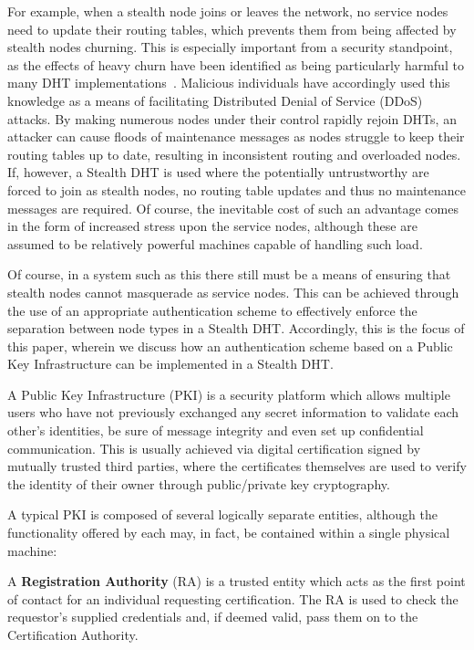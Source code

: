 \documentclass[times, 10pt,twocolumn]{article}
\begin{document}
For example, when a stealth node joins or leaves the network, no
service nodes need to update their routing tables, which prevents them
from being affected by stealth nodes churning. This is especially
important from a security standpoint, as the effects of heavy churn
have been identified as being particularly harmful to many DHT
implementations~\cite{Rhea04Handling}\cite{Li04Comparing}. Malicious
individuals have accordingly used this knowledge as a means of
facilitating Distributed Denial of Service (DDoS) attacks. By making
numerous nodes under their control rapidly rejoin DHTs, an attacker can
cause floods of maintenance messages as nodes struggle to keep their
routing tables up to date, resulting in inconsistent routing and
overloaded nodes. If, however, a Stealth DHT is used where the
potentially untrustworthy are forced to join as stealth nodes, no
routing table updates and thus no maintenance messages are required. Of
course, the inevitable cost of such an advantage comes in the form of
increased stress upon the service nodes, although these are assumed to
be relatively powerful machines capable of handling such load.

Of course, in a system such as this there still must be a means of
ensuring that stealth nodes cannot masquerade as service nodes. This
can be achieved through the use of an appropriate authentication scheme
to effectively enforce the separation between node types in a Stealth
DHT. Accordingly, this is the focus of this paper, wherein we discuss
how an authentication scheme based on a Public Key Infrastructure can
be implemented in a Stealth DHT.

\label{sect-pkioverview}

A Public Key Infrastructure (PKI) is a security platform which allows
multiple users who have not previously exchanged any secret information
to validate each other's identities, be sure of message integrity and
even set up confidential communication. This is usually achieved via
digital certification signed by mutually trusted third parties, where the
certificates themselves are used to verify the identity of their owner
through public/private key cryptography.

A typical PKI is composed of several logically separate entities,
although the functionality offered by each may, in fact, be
contained within a single physical machine:

A \textbf{Registration Authority} (RA) is a trusted entity which acts
as the first point of contact for an individual requesting
certification. The RA is used to check the requestor's supplied
credentials and, if deemed valid, pass them on to the Certification
Authority.
\end{document}
